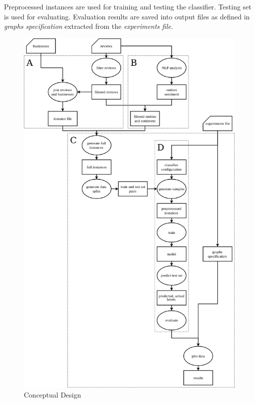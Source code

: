 Preprocessed instances are used for training and testing the classifier.
Testing set is used for evaluating.
Evaluation results are saved into output files as defined in \textit{graphs specification} extracted from
the \textit{experiments file}.


\begin{figure}[h!]
    \centering
	\includegraphics[width=\textwidth]{figures/conceptual_design.png}
	\caption{Conceptual Design}\label{fig:conceptual_design}
\end{figure}






